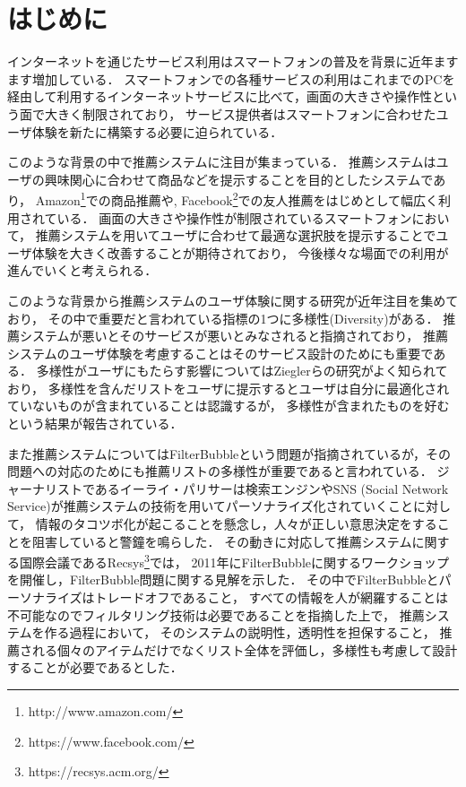 \documentclass[japanese]{jnlp_1.4}
\begin{document}
\maketitle


\section{はじめに}

インターネットを通じたサービス利用はスマートフォンの普及を背景に近年ますます増加している\cite{ictbook2014}．
スマートフォンでの各種サービスの利用はこれまでのPCを経由して利用するインターネットサービスに比べて，画面の大きさや操作性という面で大きく制限されており，
サービス提供者はスマートフォンに合わせたユーザ体験を新たに構築する必要に迫られている．

このような背景の中で推薦システムに注目が集まっている．
推薦システムはユーザの興味関心に合わせて商品などを提示することを目的としたシステムであり，
Amazon\footnote{http://www.amazon.com/}での商品推薦や, Facebook\footnote{https://www.facebook.com/}での友人推薦をはじめとして幅広く利用されている．
画面の大きさや操作性が制限されているスマートフォンにおいて，
推薦システムを用いてユーザに合わせて最適な選択肢を提示することでユーザ体験を大きく改善することが期待されており，
今後様々な場面での利用が進んでいくと考えられる．

このような背景から推薦システムのユーザ体験に関する研究が近年注目を集めており，
その中で重要だと言われている指標の1つに多様性(Diversity)がある．
推薦システムが悪いとそのサービスが悪いとみなされると指摘されており\cite{cosley2003}，
推薦システムのユーザ体験を考慮することはそのサービス設計のためにも重要である．
多様性がユーザにもたらす影響についてはZieglerらの研究がよく知られており\cite{ziegler2005}，
多様性を含んだリストをユーザに提示するとユーザは自分に最適化されていないものが含まれていることは認識するが，
多様性が含まれたものを好むという結果が報告されている．

また推薦システムについてはFilterBubbleという問題が指摘されているが，その問題への対応のためにも推薦リストの多様性が重要であると言われている\cite{Pariser2011}．
ジャーナリストであるイーライ・パリサーは検索エンジンやSNS (Social Network Service)が推薦システムの技術を用いてパーソナライズ化されていくことに対して，
情報のタコツボ化が起こることを懸念し，人々が正しい意思決定をすることを阻害していると警鐘を鳴らした．
その動きに対応して推薦システムに関する国際会議であるRecsys\footnote{https://recsys.acm.org/}では，
2011年にFilterBubbleに関するワークショップを開催し，FilterBubble問題に関する見解を示した\cite{filterbubble}．
その中でFilterBubbleとパーソナライズはトレードオフであること，
すべての情報を人が網羅することは不可能なのでフィルタリング技術は必要であることを指摘した上で，
推薦システムを作る過程において，
そのシステムの説明性，透明性を担保すること，
推薦される個々のアイテムだけでなくリスト全体を評価し，多様性も考慮して設計することが必要であるとした．
\end{document}

